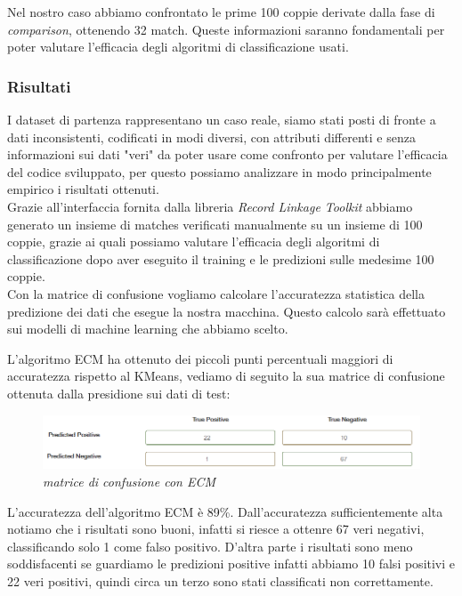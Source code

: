 \documentclass[a4paper,12pt]{article}
\begin{document}
\noindent Nel nostro caso abbiamo confrontato le prime 100 coppie derivate dalla fase di \textit{comparison}, ottenendo 32 match. Queste informazioni saranno fondamentali per poter valutare l'efficacia degli algoritmi di classificazione usati. \\


\subsubsection*{Risultati}
\noindent I dataset di partenza rappresentano un caso reale, siamo stati posti di fronte a dati inconsistenti, codificati in modi diversi, con attributi differenti e senza informazioni sui dati "veri" da poter usare come confronto per valutare l'efficacia del codice sviluppato, per questo possiamo analizzare in modo principalmente empirico i risultati ottenuti. \\

\noindent Grazie all'interfaccia fornita dalla libreria \textit{Record Linkage Toolkit} abbiamo generato un insieme di matches verificati manualmente su un insieme di 100 coppie, grazie ai quali possiamo valutare l'efficacia degli algoritmi di classificazione dopo aver eseguito il training e le predizioni sulle medesime 100 coppie. \\

\noindent Con la matrice di confusione vogliamo calcolare l'accuratezza statistica della predizione dei dati che esegue la nostra macchina. Questo calcolo sarà effettuato sui modelli di machine learning che abbiamo scelto. 

\noindent L'algoritmo ECM ha ottenuto dei piccoli punti percentuali maggiori di accuratezza rispetto al KMeans, vediamo di seguito la sua matrice di confusione ottenuta dalla presidione sui dati di test:

\begin{figure}[H]
	\centering
	\includegraphics[width=0.8\linewidth]{img/confusion_ecm.png}
	\caption{\textit{matrice di confusione con ECM}}
\end{figure}

\noindent L'accuratezza dell'algoritmo ECM è 89\%. Dall'accuratezza sufficientemente alta notiamo che i risultati sono  buoni, infatti si riesce a ottenre 67 veri negativi, classificando solo 1 come falso positivo. D'altra parte i risultati sono meno soddisfacenti se guardiamo le predizioni positive infatti abbiamo 10 falsi positivi e 22 veri positivi, quindi circa un terzo sono stati classificati non correttamente. \\
\end{document}
